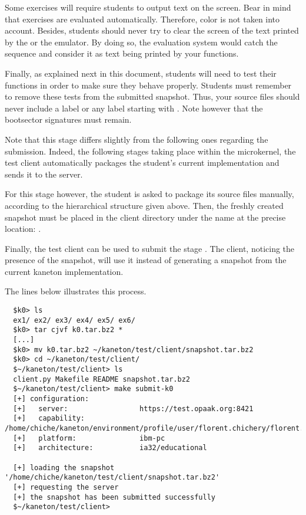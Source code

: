 Some exercises will require students to output text on the screen. Bear in
mind that exercises are evaluated automatically. Therefore, color is not
taken into account. Besides, students should never try to clear the screen
of the text printed by the  or the emulator. By doing so, the
evaluation system would catch the sequence and consider it as text being
printed by your functions.

Finally, as explained next in this document, students will need to test
their functions in order to make sure they behave properly. Students must
remember to remove these tests from the submitted snapshot. Thus, your
source files should never include a label  or any label starting
with \code{\_\_}. Note however that the bootsector signatures must remain.

Note that this stage differs slightly from the following ones regarding
the submission. Indeed, the following stages taking place within the
microkernel, the test client automatically packages the student's current
implementation and sends it to the server.

For this stage however, the student is asked to package its source files
manually, according to the hierarchical structure given above. Then,
the freshly created snapshot must be placed in the client directory
under the name  \ie{} at the precise location:
.

Finally, the test client can be used to submit the stage . The
client, noticing the presence of the snapshot, will use it instead of
generating a snapshot from the current kaneton implementation.

The lines below illustrates this process.

\begin{verbatim}
  $k0> ls
  ex1/ ex2/ ex3/ ex4/ ex5/ ex6/
  $k0> tar cjvf k0.tar.bz2 *
  [...]
  $k0> mv k0.tar.bz2 ~/kaneton/test/client/snapshot.tar.bz2
  $k0> cd ~/kaneton/test/client/
  $~/kaneton/test/client> ls
  client.py Makefile README snapshot.tar.bz2
  $~/kaneton/test/client> make submit-k0
  [+] configuration:
  [+]   server:                 https://test.opaak.org:8421
  [+]   capability:             /home/chiche/kaneton/environment/profile/user/florent.chichery/florent.chichery.cap
  [+]   platform:               ibm-pc
  [+]   architecture:           ia32/educational

  [+] loading the snapshot '/home/chiche/kaneton/test/client/snapshot.tar.bz2'
  [+] requesting the server
  [+] the snapshot has been submitted successfully
  $~/kaneton/test/client>
\end{verbatim}

